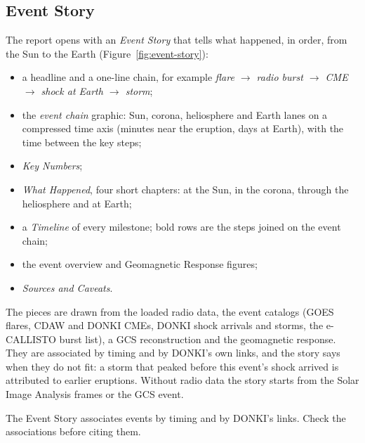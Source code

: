 \subsection{Event Story}
\label{sec:event-story}

The report opens with an \emph{Event Story} that tells what happened, in order, from the Sun
to the Earth (Figure~\ref{fig:event-story}):
\begin{itemize}
  \item a headline and a one-line chain, for example \emph{flare \(\rightarrow\) radio burst
    \(\rightarrow\) CME \(\rightarrow\) shock at Earth \(\rightarrow\) storm};
  \item the \emph{event chain} graphic: Sun, corona, heliosphere and Earth lanes on a compressed
    time axis (minutes near the eruption, days at Earth), with the time between the key steps;
  \item \emph{Key Numbers};
  \item \emph{What Happened}, four short chapters: at the Sun, in the corona, through the
    heliosphere and at Earth;
  \item a \emph{Timeline} of every milestone; bold rows are the steps joined on the event chain;
  \item the event overview and Geomagnetic Response figures;
  \item \emph{Sources and Caveats}.
\end{itemize}
The pieces are drawn from the loaded radio data, the event catalogs (GOES flares, CDAW and
DONKI CMEs, DONKI shock arrivals and storms, the e-CALLISTO burst list), a GCS reconstruction
and the geomagnetic response. They are associated by timing and by DONKI's own links, and the
story says when they do not fit: a storm that peaked before this event's shock arrived is
attributed to earlier eruptions. Without radio data the story starts from the Solar Image
Analysis frames or the GCS event.


\begin{caution}
  The Event Story associates events by timing and by DONKI's links. Check the associations
  before citing them.
\end{caution}


